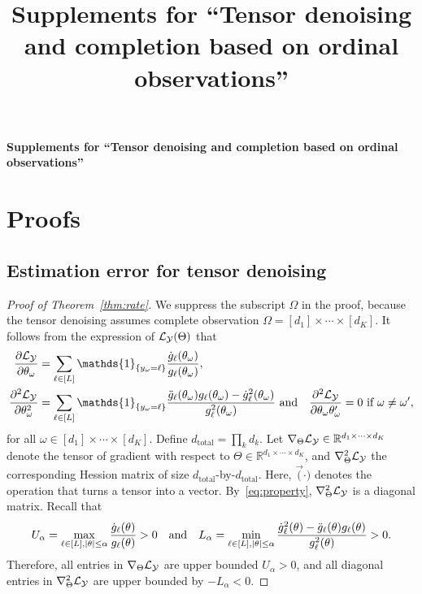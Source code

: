 \documentclass[11pt]{article}
\title{Supplements for ``Tensor denoising and completion based on ordinal observations''}
\theoremstyle{plain}
\theoremstyle{definition}
\begin{document}
\begin{center}
\begin{spacing}{1.5}
\textbf{\Large Supplements for ``Tensor denoising and completion based on ordinal observations''}
\end{spacing}
\end{center}

\section{Proofs}
\subsection{Estimation error for tensor denoising}
\begin{proof}[Proof of Theorem~\ref{thm:rate}]
We suppress the subscript $\Omega$ in the proof, because the tensor denoising assumes complete observation $\Omega=[d_1]\times \cdots \times [d_K]$. It follows from the expression of $\mathcal{L}_{\mathcal{Y}}(\Theta)$ that
\begin{align}\label{eq:property}
{\partial \flogl\over \partial \theta_\omega}&=\sum_{\ell\in[L]}\mathds{1}_{\{y_{\omega}=\ell\}}
{\dot{g}_\ell(\theta_\omega)\over g_\ell(\theta_\omega)},\notag\\
{\partial^2 \flogl\over \partial \theta_\omega^2}&=\sum_{\ell\in[L]}\mathds{1}_{\{y_\omega=\ell\}}{\ddot{g}_\ell(\theta_\omega)g_\ell(\theta_\omega)-\dot{g}^2_\ell(\theta_\omega)\over g^2_\ell(\theta_\omega)}\ \text{and}\quad
{\partial^2 \flogl\over \partial \theta_\omega \theta_\omega'}=0\ \text{if}\ \omega\neq \omega',
\end{align}
for all $\omega\in[d_1]\times \cdots \times [d_K]$.
Define $d_{\text{total}}=\prod_k d_k$. Let $\nabla_{\Theta}\mathcal{L}_{\mathcal{Y}}\in\mathbb{R}^{d_1\times\cdots\times d_K}$ denote the tensor of gradient with respect to $\Theta\in\mathbb{R}^{d_1\times \cdots\times d_K}$, and $\nabla^2_{\Theta}\mathcal{L}_{\mathcal{Y}}$ the corresponding Hession matrix of size $d_\text{total}$-by-$d_{\text{total}}$. Here, $\Vec(\cdot)$ denotes the operation that turns a tensor into a vector. By~\eqref{eq:property}, $\nabla^2_{\Theta}\mathcal{L}_{\mathcal{Y}}$ is a diagonal matrix. Recall that
\[
U_\alpha=\max_{\ell\in[L],|\theta|\leq \alpha}{\dot{g}_\ell(\theta)\over g_\ell(\theta)}>0 \quad \text{and}\quad
L_\alpha=\min_{\ell\in[L],|\theta|\leq \alpha} {\dot{g}^2_\ell(\theta)-\ddot{g}_\ell(\theta)g_\ell(\theta)\over g^2_\ell(\theta)}>0.
\]
Therefore, all entries in $\nabla_{\Theta}\mathcal{L}_{\mathcal{Y}}$ are upper bounded $U_\alpha>0$, and all diagonal entries in $\nabla^2_{\Theta}\mathcal{L}_{\mathcal{Y}}$ are upper bounded by $-L_{\alpha}<0$.


\end{proof}
\end{document}
